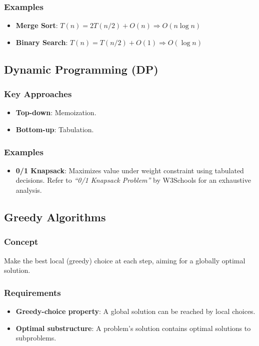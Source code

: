 \documentclass[12pt]{article}
\begin{document}
\subsubsection{Examples}
\begin{itemize}
    \item \textbf{Merge Sort}: $T(n) = 2T(n/2) + O(n) \Rightarrow O(n \log n)$
    \item \textbf{Binary Search}: $T(n) = T(n/2) + O(1) \Rightarrow O(\log n)$
\end{itemize}

\subsection{Dynamic Programming (DP)}

\subsubsection{Key Approaches}
\begin{itemize}
    \item \textbf{Top-down}:  Memoization.
    \item \textbf{Bottom-up}: Tabulation.
\end{itemize}

\subsubsection{Examples} \label{sec:dp_example}
\begin{itemize}
    \item \textbf{0/1 Knapsack}: Maximizes value under weight constraint using tabulated decisions.
    Refer to \textit{``0/1 Knapsack Problem''} by W3Schools \cite{w3schools_knapsack} for an exhaustive analysis.
\end{itemize}

\subsection{Greedy Algorithms}

\subsubsection{Concept}
Make the best local (greedy) choice at each step, aiming for a globally optimal solution.

\subsubsection{Requirements}
\begin{itemize}
    \item \textbf{Greedy-choice property}: A global solution can be reached by local choices.
    \item \textbf{Optimal substructure}: A problem's solution contains optimal solutions to subproblems.
\end{itemize}
\end{document}
